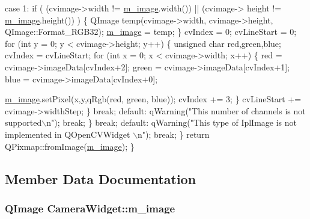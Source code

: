 \begin{DoxyCode}
            \textcolor{keywordflow}{case} 1:
                \textcolor{keywordflow}{if} ( (cvimage->width != \hyperlink{classCameraWidget_a953550f36cf3dd234dd33e36f0e85e95}{m\_image}.width()) || (cvimage->
      height != \hyperlink{classCameraWidget_a953550f36cf3dd234dd33e36f0e85e95}{m\_image}.height()) ) \{
                    QImage temp(cvimage->width, cvimage->height, 
      QImage::Format\_RGB32);
                    \hyperlink{classCameraWidget_a953550f36cf3dd234dd33e36f0e85e95}{m\_image} = temp;
                \}
                cvIndex = 0; cvLineStart = 0;
                \textcolor{keywordflow}{for} (\textcolor{keywordtype}{int} y = 0; y < cvimage->height; y++) \{
                    \textcolor{keywordtype}{unsigned} \textcolor{keywordtype}{char} red,green,blue;
                    cvIndex = cvLineStart;
                    \textcolor{keywordflow}{for} (\textcolor{keywordtype}{int} x = 0; x < cvimage->width; x++) \{
                        red = cvimage->imageData[cvIndex+2];
                        green = cvimage->imageData[cvIndex+1];
                        blue = cvimage->imageData[cvIndex+0];

                        \hyperlink{classCameraWidget_a953550f36cf3dd234dd33e36f0e85e95}{m\_image}.setPixel(x,y,qRgb(red, green, blue));
                        cvIndex += 3;
                    \}
                    cvLineStart += cvimage->widthStep;
                \}
                \textcolor{keywordflow}{break};
                \textcolor{keywordflow}{default}:
                    qWarning(\textcolor{stringliteral}{"This number of channels is not supported\(\backslash\)n"});
                    \textcolor{keywordflow}{break};
            \}
            \textcolor{keywordflow}{break};
        \textcolor{keywordflow}{default}:
            qWarning(\textcolor{stringliteral}{"This type of IplImage is not implemented in QOpenCVWidget
      \(\backslash\)n"});
            \textcolor{keywordflow}{break};
    \}
    \textcolor{keywordflow}{return} QPixmap::fromImage(\hyperlink{classCameraWidget_a953550f36cf3dd234dd33e36f0e85e95}{m\_image});
\}
\end{DoxyCode}


\subsection{Member Data Documentation}
\hypertarget{classCameraWidget_a953550f36cf3dd234dd33e36f0e85e95}{
\subsubsection[{m\-\_\-image}]{\setlength{\rightskip}{0pt plus 5cm}Q\-Image Camera\-Widget\-::m\-\_\-image\hspace{0.3cm}{\ttfamily [private]}}}\label{classCameraWidget_a953550f36cf3dd234dd33e36f0e85e95}


